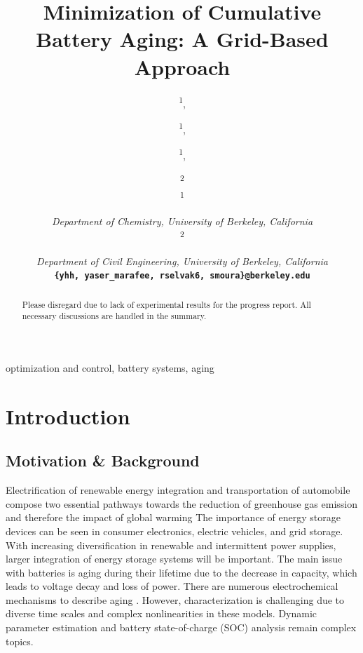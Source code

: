 \documentclass[10]{IEEEtran}
\begin{document}
	\title{Minimization of Cumulative Battery Aging: A Grid-Based Approach}
	\author{\textsuperscript{1},
		\and
	\textsuperscript{1},
		\and
	\textsuperscript{1},
		\and
	\textsuperscript{2} \\ \textsuperscript{1} \and \textit{Department of Chemistry, University of Berkeley, California} \\ \textsuperscript{2} \and \textit{Department of Civil Engineering, University of Berkeley, California} \\ \textbf{\texttt{\{yhh, yaser\_marafee, rselvak6, smoura\}@berkeley.edu}}
	}
	\maketitle
	\begin{abstract}
		Please disregard due to lack of experimental results for the progress report. All necessary discussions are handled in the summary.
	\end{abstract}
	
	\begin{IEEEkeywords}
		optimization and control, battery systems, aging
	\end{IEEEkeywords}

	\section{Introduction}
	
	\subsection{Motivation \& Background}
	Electrification of renewable energy integration and transportation of automobile compose two essential pathways towards the reduction of greenhouse gas emission and therefore the impact of global warming \cite{b1} The importance of energy storage devices can be seen in consumer electronics, electric vehicles, and grid storage. With increasing diversification in renewable and intermittent power supplies, larger integration of energy storage systems will be important. The main issue with batteries is aging during their lifetime due to the decrease in capacity, which leads to voltage decay and loss of power. There are numerous electrochemical mechanisms to describe aging \cite{b2, b3, b4}. However, characterization is challenging due to diverse time scales and complex nonlinearities in these models. Dynamic parameter estimation and battery state-of-charge (SOC) analysis remain complex topics.
	
\end{document}
